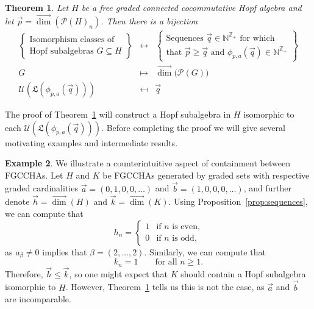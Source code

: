 \documentclass[11pt]{amsart}
\newtheorem{theorem}{Theorem}[section]
\theoremstyle{definition}
\newtheorem{example}[theorem]{Example}
\numberwithin{equation}{section}
\def\NN{{\mathbb N}}
\def\ZZ{{\mathbb Z}}
\newcommand{\FGCCHAs}{\textsf{FGCCHA}s\xspace}
\newcommand{\vecdim}{\overrightarrow{\dim}}
\begin{document}
\begin{theorem}
\label{thm:subclassification2}
Let $H$ be a free graded connected cocommutative Hopf algebra and let $\vec{p} = \vecdim(\mathcal{P}(H)_{n})$.  Then there is a bijection
\[
\begin{array}{rcl}
\left\{\begin{array}{c}
\text{Isomorphism classes of} \\
\text{Hopf subalgebras $G \subseteq H$}
\end{array}\right\}
& \leftrightarrow & 
\left\{\begin{array}{c}
\text{Sequences $\vec{q} \in \NN^{\ZZ_{+}}$ for which } \\
\text{that $\vec{p} \ge \vec{q}$ and $\phi_{p, a}(\vec{q}) \in \NN^{\ZZ_{+}}$} 
\end{array}\right\} \\[2em]
G & \mapsto & \vecdim\big(\mathcal{P}(G)\big) \\
\mathcal{U}(\mathfrak{L}(\phi_{p, a}(\vec{q}))) & \mapsfrom & \vec{q}
\end{array}
\]
\end{theorem}

The proof of Theorem~\ref{thm:subclassification2} will construct a Hopf subalgebra in $H$ isomorphic to each
$\mathcal{U}(\mathfrak{L}(\phi_{p, a}(\vec{q})))$.
Before completing the proof we will give several motivating examples and intermediate results.

\begin{example}
We illustrate a counterintuitive aspect of containment between \FGCCHAs. Let $H$ and $K$ be \FGCCHAs generated by graded sets with respective graded cardinalities $\vec{a}=(0,1,0,0,\dots)$ and $\vec{b}=(1,0,0,0,\dots)$, and further denote $\vec{h} = \vecdim(H)$ and $\vec{k} = \vecdim(K)$.
Using Proposition~\ref{prop:sequences}, we can compute that
\[
h_n = \begin{cases} 1 & \text{if $n$ is even,} \\ 0 & \text{if $n$ is odd,} \end{cases}
\]
as $a_{\beta} \neq 0$ implies that $\beta = (2, \ldots, 2)$.  Similarly, we can compute that
\[
k_{n} = 1 \qquad\text{for all $n \ge 1$}.
\]
Therefore, $\vec{h} \le \vec{k}$, so one might expect that $K$ should contain a Hopf subalgebra isomorphic to $H$.  However, Theorem~\ref{thm:subclassification2} tells us this is not the case, as $\vec{a}$ and $\vec{b}$ are incomparable.
\end{example}
\end{document}
